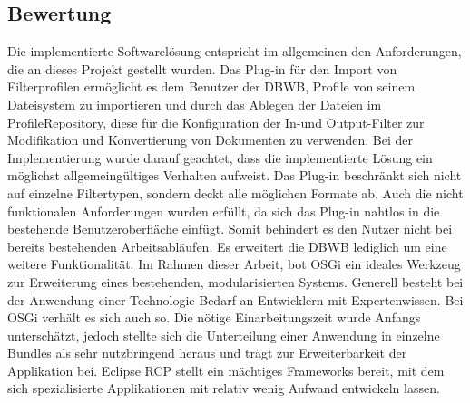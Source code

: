 {{{{\subsection{Bewertung}{
\label{sec:bewertung}
Die implementierte Softwarelösung entspricht im allgemeinen den Anforderungen, die an dieses Projekt gestellt wurden. Das Plug-in für den Import von Filterprofilen ermöglicht es dem Benutzer der \ac{DBWB}, Profile von seinem Dateisystem zu importieren und durch das Ablegen der Dateien im ProfileRepository, diese für die Konfiguration der In-und Output-Filter zur Modifikation und Konvertierung von Dokumenten zu verwenden. Bei der Implementierung wurde darauf geachtet, dass die implementierte Lösung ein möglichst allgemeingültiges Verhalten aufweist. Das Plug-in beschränkt sich nicht auf einzelne Filtertypen, sondern deckt alle möglichen Formate ab. Auch die nicht funktionalen Anforderungen wurden erfüllt, da sich das Plug-in nahtlos in die bestehende Benutzeroberfläche einfügt. Somit behindert es den Nutzer nicht bei bereits bestehenden Arbeitsabläufen. Es erweitert die \ac{DBWB} lediglich um eine weitere Funktionalität. Im Rahmen dieser Arbeit, bot \ac{OSGi} ein ideales Werkzeug zur Erweiterung eines bestehenden, modularisierten Systems. Generell besteht bei der Anwendung einer Technologie Bedarf an Entwicklern mit Expertenwissen. Bei \ac{OSGi} verhält es sich auch so. Die nötige Einarbeitungszeit wurde Anfangs unterschätzt, jedoch stellte sich die Unterteilung einer Anwendung in einzelne Bundles als sehr nutzbringend heraus und trägt zur Erweiterbarkeit der Applikation bei. Eclipse \ac{RCP} stellt ein mächtiges \glspl{Framework} bereit, mit dem sich spezialisierte Applikationen mit relativ wenig Aufwand entwickeln lassen.
} 


}

}}}
